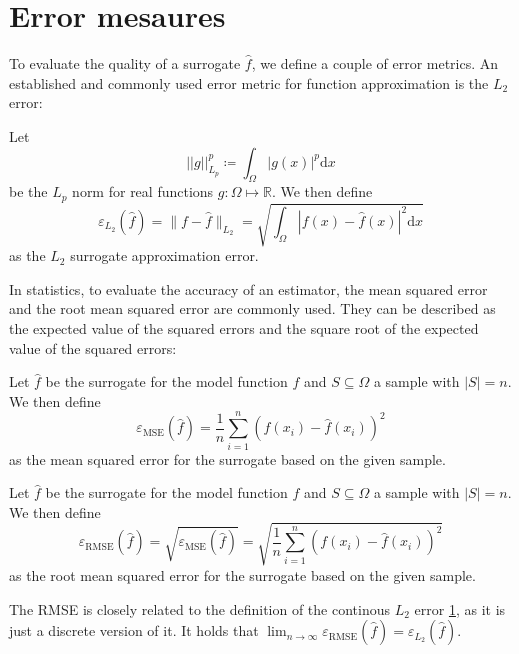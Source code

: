 \documentclass[
  a4paper,  %
  twoside,  %
  bibliography=totoc,
  headsepline,
  cleardoublepage=empty,
  parskip=half,
  draft=false
]{scrbook}
\begin{document}
\section{Error mesaures}

To evaluate the quality of a surrogate $\hat{f}$, we define a couple of error metrics.
An established and commonly used error metric for function approximation is the $L_2$ error:
\begin{definition}[$L_2$ error]
Let
\begin{equation}
||g||_{L_p}^p \coloneqq \int_{\Omega} |g(x)|^p \text{d}x
\end{equation}
be the $L_p$ norm for real functions $g \colon \Omega \mapsto \mathds{R}$.
We then define
\begin{equation}
\varepsilon_{\text{$L_2$}}(\hat{f})=\|f - \hat{f}\|_{L_2}=\sqrt{\int_{\Omega} |f(x) - \hat{f}(x)|^2 \text{d}x}
\end{equation}
as the $L_2$ surrogate approximation error.
\end{definition}

In statistics, to evaluate the accuracy of an estimator, the mean squared error and the root mean squared error are commonly used.
They can be described as the expected value of the squared errors and the square root of the expected value of the squared errors:
\begin{definition}
Let $\hat{f}$ be the surrogate for the model function $f$ and $S \subseteq \Omega$ a sample with $|S|=n$.
We then define
\begin{equation}
\varepsilon_{\text{MSE}}(\hat{f}) = \frac{1}{n} \sum_{i=1}^n (f(x_i) - \hat{f}(x_i))^2
\end{equation}
as the mean squared error for the surrogate based on the given sample.
\end{definition}

\begin{definition}
Let $\hat{f}$ be the surrogate for the model function $f$ and $S \subseteq \Omega$ a sample with $|S|=n$.
We then define
\begin{equation}
\varepsilon_{\text{RMSE}}(\hat{f}) = \sqrt{\varepsilon_{\text{MSE}}(\hat{f})} = \sqrt{\frac{1}{n} \sum_{i=1}^n (f(x_i) - \hat{f}(x_i))^2}
\end{equation}
as the root mean squared error for the surrogate based on the given sample.
\end{definition}

The RMSE is closely related to the definition of the continous $L_2$ error \ref{}, as it is just a discrete version of it.
It holds that $\lim_{n \to \infty} \varepsilon_{\text{RMSE}}(\hat{f}) = \varepsilon_{\text{$L_2$}}(\hat{f})$.
\end{document}

